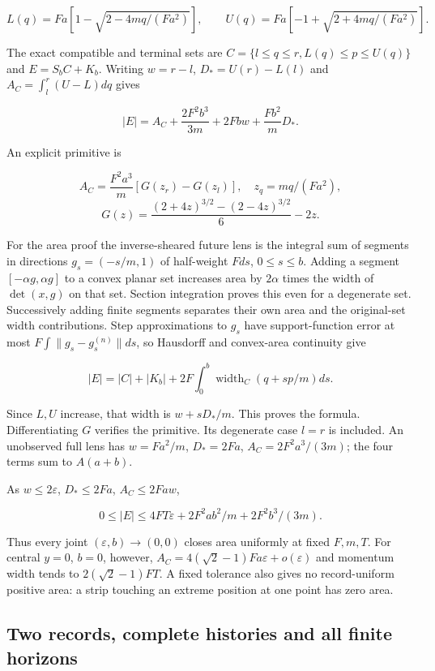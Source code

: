 \documentclass[11pt,a4paper]{article}
\begin{document}
\[L(q)=Fa[1-\sqrt{2-4mq/(Fa^2)}],\qquad
U(q)=Fa[-1+\sqrt{2+4mq/(Fa^2)}].\]

The exact compatible and terminal sets are
\(C=\{l\le q\le r,L(q)\le p\le U(q)\}\) and \(E=S_bC+K_b\). Writing
\(w=r-l\), \(D_*=U(r)-L(l)\) and \(A_C=\int_l^r(U-L)dq\) gives

\[|E|=A_C+\frac{2F^2b^3}{3m}+2Fbw+\frac{Fb^2}{m}D_*.\]

An explicit primitive is

\[A_C=\frac{F^2a^3}{m}[G(z_r)-G(z_l)],\quad z_q=mq/(Fa^2),\]
\[G(z)=\frac{(2+4z)^{3/2}-(2-4z)^{3/2}}6-2z.\]

For the area proof the inverse-sheared future lens is the integral sum
of segments in directions \(g_s=(-s/m,1)\) of half-weight \(Fds\),
\(0\le s\le b\). Adding a segment \([-\alpha g,\alpha g]\) to a convex
planar set increases area by \(2\alpha\) times the width of
\(\det(x,g)\) on that set. Section integration proves this even for a
degenerate set. Successively adding finite segments separates their own
area and the original-set width contributions. Step approximations to
\(g_s\) have support-function error at most
\(F\int\|g_s-g_s^{(n)}\|ds\), so Hausdorff and convex-area continuity
give

\[|E|=|C|+|K_b|+2F\int_0^b\operatorname{width}_C(q+sp/m)ds.\]

Since \(L,U\) increase, that width is \(w+sD_*/m\). This proves the
formula. Differentiating \(G\) verifies the primitive. Its degenerate
case \(l=r\) is included. An unobserved full lens has \(w=Fa^2/m\),
\(D_*=2Fa\), \(A_C=2F^2a^3/(3m)\); the four terms sum to \(A(a+b)\).

As \(w\le2\varepsilon\), \(D_*\le2Fa\), \(A_C\le2Faw\),

\[0\le|E|\le4FT\varepsilon+2F^2ab^2/m+2F^2b^3/(3m).\]

Thus every joint \((\varepsilon,b)\to(0,0)\) closes area uniformly at
fixed \(F,m,T\). For central \(y=0\), \(b=0\), however,
\(A_C=4(\sqrt2-1)Fa\varepsilon+o(\varepsilon)\) and momentum width tends
to \(2(\sqrt2-1)FT\). A fixed tolerance also gives no record-uniform
positive area: a strip touching an extreme position at one point has
zero area.

\hypertarget{two-records-complete-histories-and-all-finite-horizons}{%
\subsection{Two records, complete histories and all finite
horizons}\label{two-records-complete-histories-and-all-finite-horizons}}
\end{document}
